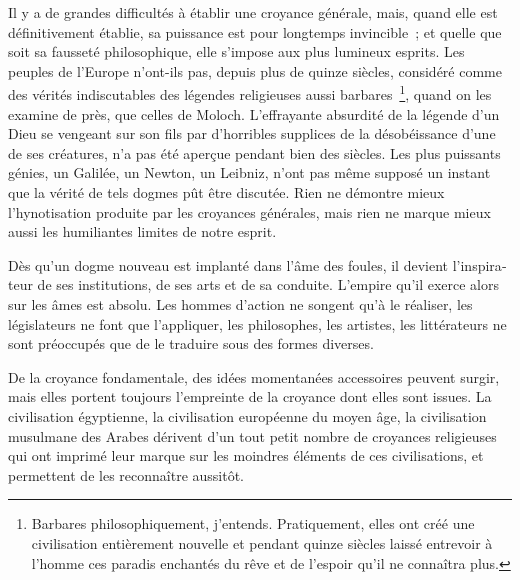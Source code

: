 \documentclass[french,twoside]{book} %
\begin{document}
Il y a de grandes difficultés à établir une croyance générale, mais, quand elle est définitivement établie, sa puissance est pour longtemps invincible ; et quelle que soit sa fausseté philosophique, elle s’impose aux plus lumineux esprits. Les peuples de l’Europe n’ont-ils pas, depuis plus de quinze siècles, considéré comme des vérités indiscutables des légendes religieuses aussi barbares \footnote{Barbares philosophiquement, j’entends. Pratiquement, elles ont créé une civilisation entièrement nouvelle et pendant quinze siècles laissé entrevoir à l’homme ces paradis enchantés du rêve et de l’espoir qu’il ne connaîtra plus.}, quand on les examine de près, que celles de Moloch. L’effrayante absurdité de la légende d’un Dieu se vengeant sur son fils par d’horribles supplices de la désobéissance d’une de ses créatures, n’a pas été aperçue pendant bien des siècles. Les plus puissants génies, un Galilée, un Newton, un Leibniz, n’ont pas même supposé un instant que la vérité de tels dogmes pût être discutée. Rien ne démontre mieux l’hynotisation produite par les croyances générales, mais rien ne marque mieux aussi les humiliantes limites de notre esprit.\par
Dès qu’un dogme nouveau est implanté dans l’âme des foules, il devient l’inspira­teur de ses institutions, de ses arts et de sa conduite. L’empire qu’il exerce alors sur les âmes est absolu. Les hommes d’action ne songent qu’à le réaliser, les législateurs ne font que l’appliquer, les philosophes, les artistes, les littérateurs ne sont préoccupés que de le traduire sous des formes diverses.\par
De la croyance fondamentale, des idées momentanées accessoires peuvent surgir, mais elles portent toujours l’empreinte de la croyance dont elles sont issues. La civili­sation égyptienne, la civilisation européenne du moyen âge, la civilisation musulmane des Arabes dérivent d’un tout petit nombre de croyances religieuses qui ont imprimé leur marque sur les moindres éléments de ces civilisations, et permettent de les reconnaître aussitôt.\par
\end{document}
